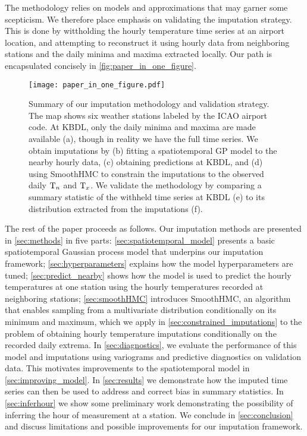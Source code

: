 The methodology relies on models and approximations that may garner some scepticism.
We therefore place emphasis on validating the imputation strategy.
This is done by wittholding the hourly temperature time series at an airport location,
and attempting to reconstruct it using hourly data from neighboring stations 
and the daily minima and maxima extracted locally.
Our path is encapsulated concisely in \autoref{fig:paper_in_one_figure}.

\begin{figure}[tb]
\centering
\texttt{[image: paper\_in\_one\_figure.pdf]}
\caption{\label{fig:paper_in_one_figure}
Summary of our imputation methodology and validation strategy.
The map shows six weather stations labeled by the ICAO airport code.
At KBDL, only the daily minima and maxima are made available (a), though in reality
we have the full time series.
We obtain imputations by (b) fitting a spatiotemporal GP model to the nearby hourly data,
(c) obtaining predictions at KBDL, and (d) using SmoothHMC to constrain the imputations to the observed daily $\mathrm{T}_{n}$ and $\mathrm{T}_{x}$.
We validate the methodology by comparing a summary statistic of the withheld time series at KBDL (e) to
its distribution extracted from the imputations (f).
}
\end{figure}

The rest of the paper proceeds as follows.
Our imputation methods are presented in \autoref{sec:methods} in five parts:
\autoref{sec:spatiotemporal_model} presents a basic spatiotemporal Gaussian process model 
that underpins our imputation framework;
\autoref{sec:hyperparameters} explains how the model hyperparameters are tuned;
\autoref{sec:predict_nearby} shows how the model is used to predict the hourly temperatures 
at one station using the hourly temperatures recorded at neighboring stations;
\autoref{sec:smoothHMC} introduces SmoothHMC, an algorithm that enables
sampling from a multivariate distribution conditionally on its minimum and maximum,
which we apply in \autoref{sec:constrained_imputations} to the problem
of obtaining hourly temperature imputations conditionally on the recorded daily extrema.
In \autoref{sec:diagnostics}, we evaluate the performance of this model and imputations
using variograms and predictive diagnostics on validation data.
This motivates improvements to the spatiotemporal model in \autoref{sec:improving_model}.
In \autoref{sec:results} we demonstrate how the imputed time series can then be used 
to address and correct bias in summary statistics.
In \autoref{sec:inferhour} we show some preliminary work demonstrating the possibility of inferring the hour of measurement
at a station.
We conclude in \autoref{sec:conclusion} and discuss limitations and possible improvements for 
our imputation framework.


